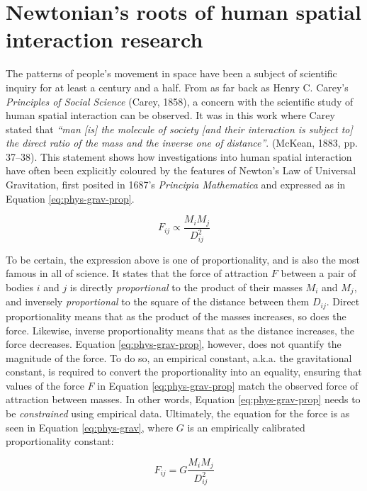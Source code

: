 \documentclass[
11pt, %
oneside, %
english, %
singlespacing, %
]{macthesis} %
\begin{document}
\section{Newtonian's roots of human spatial interaction research}\label{newtonians-roots-of-human-spatial-interaction-research}

The patterns of people's movement in space have been a subject of scientific inquiry for at least a century and a half. From as far back as Henry C. Carey's \emph{Principles of Social Science} (Carey, 1858), a concern with the scientific study of human spatial interaction can be observed. It was in this work where Carey stated that \emph{``man [is] the molecule of society [and their interaction is subject to] the direct ratio of the mass and the inverse one of distance''}. (McKean, 1883, pp. 37--38). This statement shows how investigations into human spatial interaction have often been explicitly coloured by the features of Newton's Law of Universal Gravitation, first posited in 1687's \emph{Principia Mathematica} and expressed as in Equation \ref{eq:phys-grav-prop}.

\begin{equation}
\label{eq:phys-grav-prop}
F_{ij} \propto \frac{M_i M_j} {D_{ij}^{2}}
\end{equation} 

To be certain, the expression above is one of proportionality, and is also the most famous in all of science. It states that the force of attraction \(F\) between a pair of bodies \(i\) and \(j\) is directly \emph{proportional} to the product of their masses \(M_i\) and \(M_j\), and inversely \emph{proportional} to the square of the distance between them \(D_{ij}\). Direct proportionality means that as the product of the masses increases, so does the force. Likewise, inverse proportionality means that as the distance increases, the force decreases. Equation \ref{eq:phys-grav-prop}, however, does not quantify the magnitude of the force. To do so, an empirical constant, a.k.a. the gravitational constant, is required to convert the proportionality into an equality, ensuring that values of the force \(F\) in Equation \ref{eq:phys-grav-prop} match the observed force of attraction between masses. In other words, Equation \ref{eq:phys-grav-prop} needs to be \emph{constrained} using empirical data. Ultimately, the equation for the force is as seen in Equation \ref{eq:phys-grav}, where \(G\) is an empirically calibrated proportionality constant:

\begin{equation}
\label{eq:phys-grav}
F_{ij} = G \frac{M_i M_j} {D_{ij}^{2}}
\end{equation} 
\end{document}
